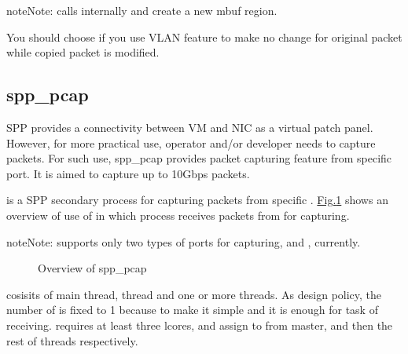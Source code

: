 \documentclass[a4paper,11pt,openany,oneside,english]{sphinxmanual}
\begin{document}
\begin{sphinxadmonition}{note}{Note:}
 calls  internally and
 create a new mbuf region.
\end{sphinxadmonition}

You should choose  if you use VLAN feature to make no change for
original packet while copied packet is modified.


\subsection{spp\_pcap}
\label{\detokenize{design/spp_secondary:spp-pcap}}\label{\detokenize{design/spp_secondary:spp-design-spp-sec-pcap}}
SPP provides a connectivity between VM and NIC as a virtual patch panel.
However, for more practical use, operator and/or developer needs to capture
packets. For such use, spp\_pcap provides packet capturing feature from
specific port. It is aimed to capture up to 10Gbps packets.

 is a SPP secondary process for capturing packets from specific
. \hyperref[\detokenize{design/spp_secondary:figure-spp-pcap-overview}]{Fig.\@ \ref{\detokenize{design/spp_secondary:figure-spp-pcap-overview}}} shows an overview of use of
 in which  process receives packets from 
for capturing.

\begin{sphinxadmonition}{note}{Note:}
 supports only two types of ports for capturing, 
and , currently.
\end{sphinxadmonition}

\begin{figure}[htbp]
\centering
\capstart

\noindent{}
\caption{Overview of spp\_pcap}\label{\detokenize{design/spp_secondary:id5}}\label{\detokenize{design/spp_secondary:figure-spp-pcap-overview}}\end{figure}

 cosisits of main thread,  thread and one or more
 threads. As design policy, the number of  is fixed
to 1 because to make it simple and it is enough for task of receiving.
 requires at least three lcores, and assign to from master,
 and then the rest of  threads respectively.
\end{document}
